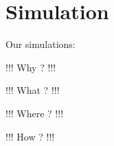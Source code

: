 \chapter{Simulation}\label{ch:simulation}
Our simulations:

!!! Why ? !!!

!!! What ? !!!

!!! Where ? !!!

!!! How ? !!!


